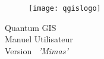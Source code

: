 \begin{titlepage}
\begin{center}

\begin{figure}[H]
\begin{center}
\texttt{[image: qgislogo]} 
\end{center}
\end{figure}

\Huge{Quantum GIS}\\
\vspace{0.5cm}
\Large{Manuel Utilisateur} \\
\vspace{0.5cm}
\Large{Version ~\CURRENT \textsl{'Mimas'}}

\end{center}
\end{titlepage}

